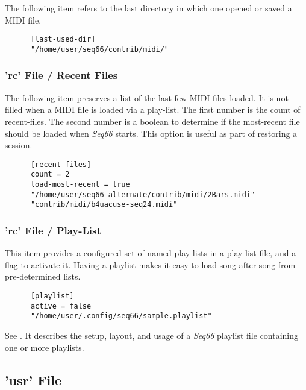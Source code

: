    The following item refers to the last directory in which one opened or
   saved a MIDI file.

   \begin{verbatim}
      [last-used-dir]
      "/home/user/seq66/contrib/midi/"
   \end{verbatim}

\subsubsection{'rc' File / Recent Files}
\label{subsubsec:configuration_rc_recent_files}

   The following item preserves a list of the last few MIDI files loaded.
   It is not filled when a MIDI file is loaded via a play-list.
   The first number is the count of recent-files.
   The second number is a boolean to determine if the most-recent file
   should be loaded when \textsl{Seq66} starts.
   This option is useful as part of restoring a session.

   \begin{verbatim}
      [recent-files]
      count = 2
      load-most-recent = true
      "/home/user/seq66-alternate/contrib/midi/2Bars.midi"
      "contrib/midi/b4uacuse-seq24.midi"
   \end{verbatim}

\subsubsection{'rc' File / Play-List}
\label{subsubsec:configuration_rc_playlist}

   This item provides a configured set of named play-lists in a play-list file,
   and a flag to activate it.
   Having a playlist makes it easy to load song after song from pre-determined
   lists.
   
   \index{[playlist]}
   \begin{verbatim}
      [playlist]
      active = false
      "/home/user/.config/seq66/sample.playlist"
   \end{verbatim}

   See .
   It describes the setup, layout, and usage of a
   \textsl{Seq66} playlist file containing one or more playlists.

\subsection{'usr' File}
\label{subsec:configuration_usr}


